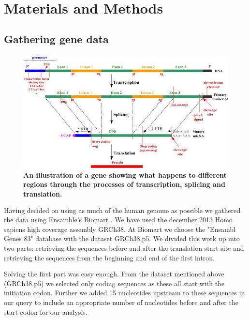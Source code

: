 \documentclass[10pt,letterpaper]{article}
\begin{document}
\section*{Materials and Methods}
\subsection*{Gathering gene data}

\begin{figure}[h]
\includegraphics[width=5in]{gene_composition.jpg}
\caption{\bf An illustration of a gene showing what happens to different regions through the processes of transcription, splicing and translation.\cite{bib5}}
\label{fig1}
\end{figure}

Having decided on using as much of the human genome as possible we gathered the data using Ensamble's Biomart \cite{bib3}. We have used the december 2013 Homo sapiens high coverage assembly GRCh38. At Biomart we choose the "Ensambl Genes 83" database with the dataset GRCh38.p5. We divided this work up into two parts: retrieving the sequences before and after the translation start site and retrieving the sequences from the beginning and end of the first intron.

Solving the first part was easy enough. From the dataset mentioned above (GRCh38.p5) we selected only coding sequences as these all start with the initiation codon. Further we added 15 nucleotides upstream to these sequences in our query to include an appropriate number of nucleotides before and after the start codon for our analysis.
\end{document}
